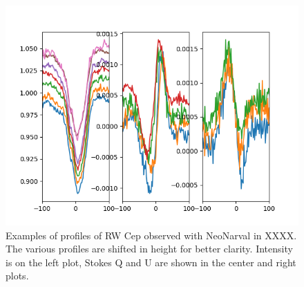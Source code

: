\documentclass{/Users/art2/TeX/aanda/aa}
\def\kms {km\,s$^{-1}$}
\begin{document}
\begin{figure}
   \includegraphics[width=\textwidth]{RWCep.png}
   \caption{ Examples of profiles of RW Cep observed with NeoNarval in XXXX. The various profiles 
   are shifted in height for better clarity. Intensity is on the left plot, Stokes Q and U are shown 
   in the center and right plots.}
   \label{observed}
   \end{figure}
\end{document}
